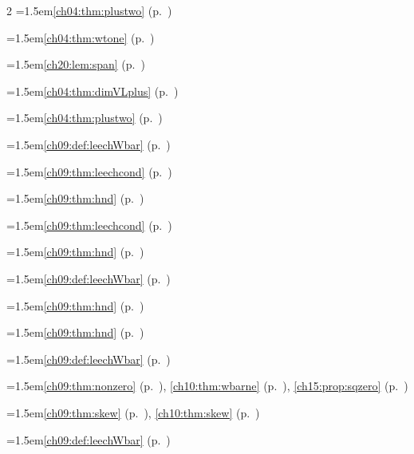 \begin{multicols}{2}
\hangindent=1.5em\quad \ref{ch04:thm:plustwo} (p.~\pageref{ch04:thm:plustwo})\par
\hangindent=1.5em\quad \ref{ch04:thm:wtone} (p.~\pageref{ch04:thm:wtone})\par
\hangindent=1.5em\quad \ref{ch20:lem:span} (p.~\pageref{ch20:lem:span})\par
\hangindent=1.5em\quad \ref{ch04:thm:dimVLplus} (p.~\pageref{ch04:thm:dimVLplus})\par
\hangindent=1.5em\quad \ref{ch04:thm:plustwo} (p.~\pageref{ch04:thm:plustwo})\par
\hangindent=1.5em\quad \ref{ch09:def:leechWbar} (p.~\pageref{ch09:def:leechWbar})\par
\hangindent=1.5em\quad \ref{ch09:thm:leechcond} (p.~\pageref{ch09:thm:leechcond})\par
\hangindent=1.5em\quad \ref{ch09:thm:hnd} (p.~\pageref{ch09:thm:hnd})\par
\hangindent=1.5em\quad \ref{ch09:thm:leechcond} (p.~\pageref{ch09:thm:leechcond})\par
\hangindent=1.5em\quad \ref{ch09:thm:hnd} (p.~\pageref{ch09:thm:hnd})\par
\hangindent=1.5em\quad \ref{ch09:def:leechWbar} (p.~\pageref{ch09:def:leechWbar})\par
\hangindent=1.5em\quad \ref{ch09:thm:hnd} (p.~\pageref{ch09:thm:hnd})\par
\hangindent=1.5em\quad \ref{ch09:thm:hnd} (p.~\pageref{ch09:thm:hnd})\par
\hangindent=1.5em\quad \ref{ch09:def:leechWbar} (p.~\pageref{ch09:def:leechWbar})\par
\hangindent=1.5em\quad \ref{ch09:thm:nonzero} (p.~\pageref{ch09:thm:nonzero}), \ref{ch10:thm:wbarne} (p.~\pageref{ch10:thm:wbarne}), \ref{ch15:prop:sqzero} (p.~\pageref{ch15:prop:sqzero})\par
\hangindent=1.5em\quad \ref{ch09:thm:skew} (p.~\pageref{ch09:thm:skew}), \ref{ch10:thm:skew} (p.~\pageref{ch10:thm:skew})\par
\hangindent=1.5em\quad \ref{ch09:def:leechWbar} (p.~\pageref{ch09:def:leechWbar})\par

\end{multicols}
